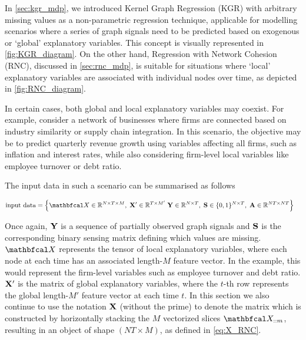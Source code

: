 \label{sec:kgrnc}

In \cref{sec:kgr_mdp}, we introduced Kernel Graph Regression (KGR) with arbitrary missing values as a non-parametric regression technique, applicable for modelling scenarios where a series of graph signals need to be predicted based on exogenous or `global' explanatory variables. This concept is visually represented in \cref{fig:KGR_diagram}. On the other hand, Regression with Network Cohesion (RNC), discussed in \cref{sec:rnc_mdp}, is suitable for situations where `local' explanatory variables are associated with individual nodes over time, as depicted in \cref{fig:RNC_diagram}.

In certain cases, both global and local explanatory variables may coexist. For example, consider a network of businesses where firms are connected based on industry similarity or supply chain integration. In this scenario, the objective may be to predict quarterly revenue growth using variables affecting all firms, such as inflation and interest rates, while also considering firm-level local variables like employee turnover or debt ratio.

The input data in such a scenario can be summarised as follows

\begin{align*}
    \text{input data} &= \left\{\Xt \in \R^{N \times T \times M}, \; \X' \in \R^{T \times M'} \; \Y \in \R^{N \times T}, \; \Ss \in \{0, 1\}^{N \times T}, \; \A \in \R^{NT \times NT} \right\}
\end{align*}

Once again, $\mathbf{Y}$ is a sequence of partially observed graph signals and $\mathbf{S}$ is the corresponding binary sensing matrix  defining which values are missing. $\Xt$ represents the tensor of local explanatory variables, where each node at each time has an associated length-$M$ feature vector. In the example, this would represent the firm-level variables such as employee turnover and debt ratio. $\mathbf{X}'$ is the matrix of global explanatory variables, where the $t$-th row represents the global length-$M'$ feature vector at each time $t$. In this section we also continue to use the notation $\mathbf{X}$ (without the prime) to denote the matrix which is constructed by horizontally stacking the $M$ vectorized slices $\Xt_{::m}$, resulting in an object of shape $(NT \times M)$, as defined in \cref{eq:X_RNC}. 

